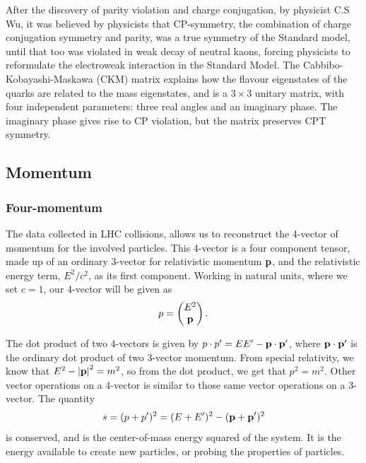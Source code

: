 \documentclass[12pt,a4paper]{article}
\numberwithin{equation}{section}
\begin{document}
After the discovery of parity violation and charge conjugation, by physicist C.S
Wu\cite{PhysRev.105.1413}, it was believed by physicists that CP-symmetry, the
combination of charge conjugation symmetry and parity, was a true symmetry of
the Standard model, until that too was violated in weak decay of neutral kaons,
forcing physicists to reformulate the electroweak interaction in the Standard
Model. The Cabbibo-Kobayashi-Maskawa (CKM) matrix explains how the flavour
eigenstates of the quarks are related to the mass eigenstates, and is a $3 \times 3$
unitary matrix, with four independent parameters: three real angles and an
imaginary phase\cite[153]{Povh2015}. The imaginary phase gives rise to CP
violation, but the matrix preserves CPT symmetry.

\subsection{Momentum}\label{sec:momentum}

\subsubsection{Four-momentum}
The data collected in LHC collisions, allows us to reconstruct the 4-vector of
momentum for the involved particles. This 4-vector is a four component tensor,
made up of an ordinary 3-vector for relativistic momentum $\vb p$, and the
relativistic energy term, $E^2/c^2$, as its first component. Working in natural
units, where we set $c=1$, our 4-vector will be given as
\begin{equation}
p = \left(\begin{matrix} E^2 \\ \vb p \end{matrix} \right).
\end{equation}

The dot product of two 4-vectors is given by $p\cdot p' = E E' - \vb p \cdot \vb{p'}$,
where $\vb p \cdot \vb{p'}$ is the ordinary dot product of two 3-vector momentum.
From special relativity, we know that $E^2 - \abs{\vb p}^2 = m^2$, so from the
dot product, we get that $p^2 = m^2$. Other vector operations on a 4-vector is
similar to those same vector operations on a 3-vector. The quantity
\begin{equation}
s = (p + p')^2 = (E + E')^2 - (\vb p + \vb p')^2
\end{equation}
is conserved, and is the center-of-mass energy squared of the system. It is the
energy available to create new particles, or probing the properties of
particles.
\end{document}
